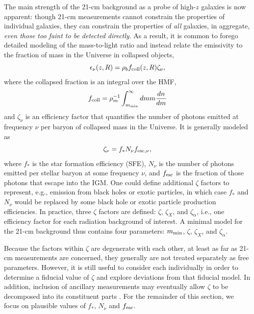 The main strength of the 21-cm background as a probe of high-$z$ galaxies is now apparent: though 21-cm measurements cannot constrain the properties of individual galaxies, they can constrain the properties of \textit{all} galaxies, in aggregate, \textit{even those too faint to be detected directly}. As a result, it is common to forego detailed modeling of the mass-to-light ratio and instead relate the emissivity to the fraction of mass in the Universe in collapsed objects,
\begin{equation}
	\epsilon_{\nu}(z, R) = \rho_b f_{\text{coll}}(z, R) \zeta_{\nu} ,
\end{equation}
where the collapsed fraction is an integral over the HMF,
\begin{equation}
	f_{\text{coll}} = \rho_m^{-1} \int_{m_{\text{min}}}^{\infty} dm m \frac{dn}{dm}
\end{equation}
and $\zeta_{\nu}$ is an efficiency factor that quantifies the number of photons emitted at frequency $\nu$ per baryon of collapsed mass in the Universe. It is generally modeled as
\begin{equation}
	\zeta_{\nu} = f_{\ast} N_{\nu} f_{\text{esc},\nu} , \label{eq:zeta}
\end{equation}
where $f_{\ast}$ is the star formation efficiency (SFE), $N_{\nu}$ is the number of photons emitted per stellar baryon at some frequency $\nu$, and $f_{\text{esc}}$ is the fraction of those photons that escape into the IGM. One could define additional $\zeta$ factors to represent, e.g., emission from black holes or exotic particles, in which case $f_{\ast}$ and $N_{\nu}$ would be replaced by some black hole or exotic particle production efficiencies. In practice, three $\zeta$ factors are defined: $\zeta$, $\zeta_X$, and $\zeta_{\alpha}$, i.e., one efficiency factor for each radiation background of interest. A minimal model for the 21-cm background thus contains four parameters: $m_{\text{min}}$, $\zeta$, $\zeta_X$, and $\zeta_{\alpha}$. 

Because the factors within $\zeta$ are degenerate with each other, at least as far as 21-cm measurements are concerned, they generally are not treated separately as free parameters. However, it is still useful to consider each individually in order to determine a fiducial value of $\zeta$ and explore deviations from that fiducial model. In addition, inclusion of ancillary measurements may eventually allow $\zeta$ to be decomposed into its constituent parts \cite{Mirocha2017,Park2019,Greig2019}. For the remainder of this section, we focus on plausible values of $f_{\ast}$, $N_{\nu}$ and $f_{\text{esc}}$.

